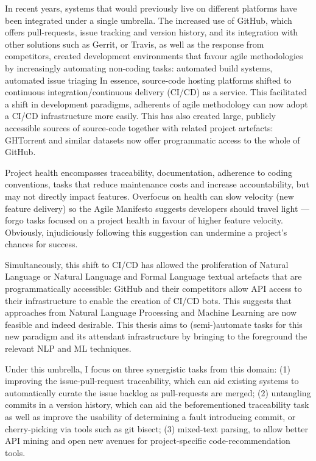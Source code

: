 In recent years, systems that would previously live on different platforms have
been integrated under a single umbrella. The increased use of GitHub, which
offers pull-requests, issue tracking and version history, and its integration
with other solutions such as Gerrit, or Travis, as well as the response from
competitors, created development environments that favour agile methodologies by
increasingly automating non-coding tasks: automated build systems, automated
issue triaging \etc In essence, source-code hosting platforms shifted to
continuous integration/continuous delivery (CI/CD) as a service. This
facilitated a shift in development paradigms, adherents of agile methodology can
now adopt a CI/CD infrastructure more easily. This has also created large,
publicly accessible sources of source-code together with related project
artefacts: GHTorrent and similar datasets now offer programmatic access to the
whole of GitHub.

Project health encompasses traceability, documentation, adherence to coding
conventions, tasks that reduce maintenance costs and increase accountability,
but may not directly impact features.  Overfocus on health can slow velocity
(new feature delivery) so the Agile Manifesto suggests developers should travel
light --- forgo tasks focused on a project health in favour of higher feature
velocity. Obviously, injudiciously following this suggestion can undermine a
project's chances for success.

Simultaneously, this shift to CI/CD has allowed the proliferation of Natural
Language or Natural Language and Formal Language textual artefacts that are
programmatically accessible: GitHub and their competitors allow API access to
their infrastructure to enable the creation of CI/CD bots. This suggests that
approaches from Natural Language Processing and Machine Learning are now
feasible and indeed desirable. This thesis aims to (semi-)automate tasks for
this new paradigm and its attendant infrastructure by bringing to the foreground
the relevant NLP and ML techniques.

Under this umbrella, I focus on three synergistic tasks from this domain: (1)
improving the issue-pull-request traceability, which can aid existing systems to
automatically curate the issue backlog as pull-requests are merged; (2)
untangling commits in a version history, which can aid the beforementioned
traceability task as well as improve the usability of determining a fault
introducing commit, or cherry-picking via tools such as git bisect; (3)
mixed-text parsing, to allow better API mining and open new avenues for
project-specific code-recommendation tools.